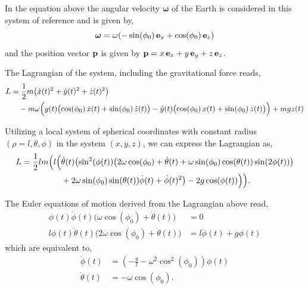\documentclass[12pt]{article}
\begin{document}
In the equation above the angular velocity $\boldsymbol{\omega}$ of the Earth is considered
in this system of reference and is given by,
\begin{equation}
  \boldsymbol{\omega} = \omega(-\sin(\phi_0)\,\vb{e}_x + \cos(\phi_0)\,\vb{e}_z)
\end{equation}
and the position vector $\vb{p}$ is given by $\vb{p} = x\,\vb{e}_x + y\,\vb{e}_y + z\,\vb{e}_z$.

The Lagrangian of the system, including the gravitational force reads,
\begin{equation}
  \begin{aligned}
    L &= \frac{1}{2}m\bigl(\dot{x}(t)^2 + \dot{y}(t)^2 + \dot{z}(t)^2\bigr) \\
      &\quad - m\omega\Bigl(y(t)\bigl(\cos(\phi_0)\,\dot{x}(t) + \sin(\phi_0)\,\dot{z}(t)\bigr)
        - \dot{y}(t)\bigl(\cos(\phi_0)\,x(t) + \sin(\phi_0)\,z(t)\bigr)\Bigr) + mgz(t)
  \end{aligned}
\end{equation}

Utilizing a local system of spherical coordinates with constant radius $(\rho = l, \theta, \phi)$
in the system $(x,y,z)$, we can express the Lagrangian as,
\begin{equation}
  \begin{aligned}
    L = \frac{1}{2}lm\Bigl(l\Bigl(&\dot\theta(t)\bigl(\sin^2(\phi(t))\bigl(2\omega\cos(\phi_0)
        + \dot\theta(t) + \omega\sin(\phi_0)\cos(\theta(t))\sin(2\phi(t))\bigr) \\
      &+2\omega\sin(\phi_0)\sin(\theta(t))\dot\phi(t) + \dot\phi(t)^2\bigr) - 2g\cos(\phi(t))\Bigr)\Bigr).
  \end{aligned}
\end{equation}

The Euler equations of motion derived from the Lagrangian above read,
\begin{align}
  \phi(t)\dot\phi(t)\bigl(\omega\cos(\phi_0) + \dot\theta(t)\bigr) &= 0 \\
  l\phi(t)\dot\theta(t)\bigl(2\omega\cos(\phi_0) + \dot\theta(t)\bigr)
    &= l\ddot\phi(t) + g\phi(t)
\end{align}
which are equivalent to,
\begin{align}
  \ddot\phi(t) &= \left(-\frac{g}{l} - \omega^2\cos^2(\phi_0)\right)\phi(t) \\
  \dot\theta(t) &= -\omega\cos(\phi_0).
\end{align}
\end{document}
